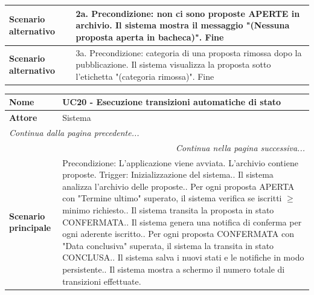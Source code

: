 \documentclass[12pt, a4paper, oneside]{report}
\begin{document}
\begin{tabularx}{\textwidth}{|l|X|}
    \textbf{Scenario alternativo} & 
    2a. Precondizione: non ci sono proposte APERTE in archivio.\newline
    Il sistema mostra il messaggio "(Nessuna proposta aperta in bacheca)".\newline
    Fine \\ \hline
    \textbf{Scenario alternativo} & 
    3a. Precondizione: categoria di una proposta rimossa dopo la pubblicazione.\newline
    Il sistema visualizza la proposta sotto l'etichetta "(categoria rimossa)".\newline
    Fine \\ \hline
\end{tabularx}

\begin{tabularx}{\textwidth}{|l|X|}
    \hline
    \textbf{Nome}               & \textbf{UC20 - Esecuzione transizioni automatiche di stato} \\ \hline
    \textbf{Attore}             & Sistema \\ \hline
    \endfirsthead 
    \hline
    \multicolumn{2}{|l|}{\textit{Continua dalla pagina precedente...}} \\ \hline
    \endhead 
    \hline
    \multicolumn{2}{|r|}{\textit{Continua nella pagina successiva...}} \\ \hline
    \endfoot 
    \hline
    \endlastfoot
    \textbf{Scenario principale} & 
    Precondizione: L'applicazione viene avviata. L'archivio contiene proposte.\newline
    Trigger: Inizializzazione del sistema.\newline
    1. Il sistema analizza l'archivio delle proposte.\newline
    2. Per ogni proposta APERTA con "Termine ultimo" superato, il sistema verifica se iscritti $\ge$ minimo richiesto.\newline
    3. Il sistema transita la proposta in stato CONFERMATA.\newline
    4. Il sistema genera una notifica di conferma per ogni aderente iscritto.\newline
    5. Per ogni proposta CONFERMATA con "Data conclusiva" superata, il sistema la transita in stato CONCLUSA.\newline
    6. Il sistema salva i nuovi stati e le notifiche in modo persistente.\newline
    7. Il sistema mostra a schermo il numero totale di transizioni effettuate.\newline

\end{tabularx}
\end{document}
